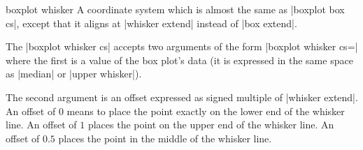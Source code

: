 \begin{coordinatesystem}{boxplot whisker}%
	A coordinate system which is almost the same as |boxplot box cs|, except that it aligns at |whisker extend| instead of |box extend|.

	The |boxplot whisker cs| accepts two arguments of the form
 |boxplot whisker cs=|
	where the first is a value of the box plot's data (it is expressed in the same space as |median| or |upper whisker|). 

	The second argument is an offset expressed as signed multiple of |whisker extend|. An offset of $0$ means to place the point exactly on the lower end of the whisker line. An offset of $1$ places the point on the upper end of the whisker line. An offset of $0.5$ places the point in the middle of the whisker line.

\begin{codeexample}[]
\end{codeexample}
\end{coordinatesystem}

% 
% 
% 


